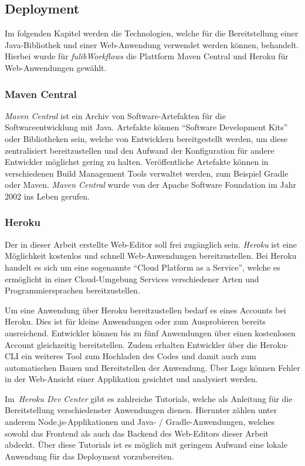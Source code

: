\subsection{Deployment}\label{subsec:deployment}
Im folgenden Kapitel werden die Technologien, welche für die Bereitstellung einer Java-Bibliothek und einer Web-Anwendung verwendet werden können, behandelt.
Hierbei wurde für \textit{fulibWorkflows} die Plattform Maven Central und Heroku für Web-Anwendungen gewählt.

\subsubsection{Maven Central}\label{subsubsec:mavencentral}
\textit{Maven Central} ist ein Archiv von Software-Artefakten für die Softwareentwicklung mit Java.
Artefakte können ``Software Development Kits'' oder Bibliotheken sein, welche von Entwicklern bereitgestellt werden, um diese zentralisiert bereitzustellen
und den Aufwand der Konfiguration für andere Entwickler möglichst gering zu halten.
Veröffentliche Artefakte können in verschiedenen Build Management Tools verwaltet werden, zum Beispiel Gradle oder Maven.
\textit{Maven Central} wurde von der Apache Software Foundation im Jahr 2002 ins Leben gerufen\cite*{maven}.

\subsubsection{Heroku}\label{subsubsec:heroku}
Der in dieser Arbeit erstellte Web-Editor soll frei zugänglich sein.
\textit{Heroku} ist eine Möglichkeit kostenlos und schnell Web-Anwendungen bereitzustellen.
Bei Heroku handelt es sich um eine sogenannte ``Cloud Platform as a Service'', welche es ermöglicht in einer Cloud-Umgebung
Services verschiedener Arten und Programmiersprachen bereitzustellen\cite*{heroku}.

Um eine Anwendung über Heroku bereitzustellen bedarf es eines Accounts bei Heroku.
Dies ist für kleine Anwendungen oder zum Ausprobieren bereits ausreichend.
Entwickler können bis zu fünf Anwendungen über einen kostenlosen Account gleichzeitig bereitstellen.
Zudem erhalten Entwickler über die Heroku-CLI ein weiteres Tool zum Hochladen des Codes und damit auch zum automatischen
Bauen und Bereitstellen der Anwendung.
Über Logs können Fehler in der Web-Ansicht einer Applikation gesichtet und analysiert werden.

Im~\textit{Heroku Dev Center} gibt es zahlreiche Tutorials, welche als Anleitung für die Bereitstellung verschiedenster Anwendungen dienen.
Hierunter zählen unter anderem Node.js-Applikationen und Java- / Gradle-Anwendungen, welches sowohl das Frontend als auch das Backend
des Web-Editors dieser Arbeit abdeckt\cite*{herokuDev}.
Über diese Tutorials ist es möglich mit geringem Aufwand eine lokale Anwendung für das Deployment vorzubereiten.
